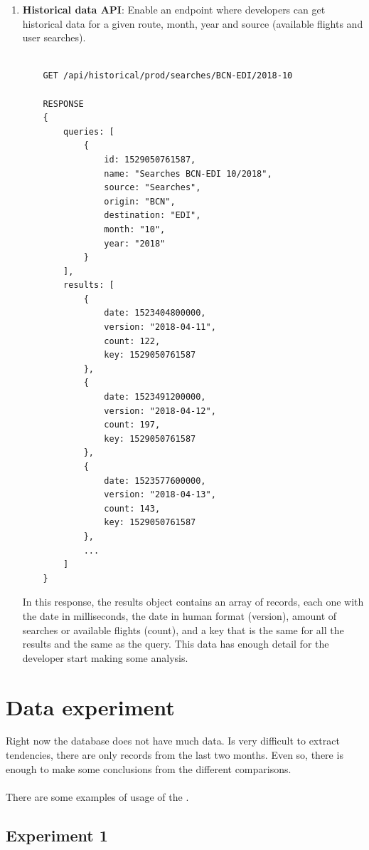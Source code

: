 \begin{enumerate}
    \item \textbf{Historical data API}: Enable an endpoint where developers can get historical data for a given route, month, year and source (available flights and user searches).
    \\\\
    \begin{verbatim}
    GET /api/historical/prod/searches/BCN-EDI/2018-10

    RESPONSE
    {
        queries: [
            {
                id: 1529050761587,
                name: "Searches BCN-EDI 10/2018",
                source: "Searches",
                origin: "BCN",
                destination: "EDI",
                month: "10",
                year: "2018"
            }
        ],
        results: [
            {
                date: 1523404800000,
                version: "2018-04-11",
                count: 122,
                key: 1529050761587
            },
            {
                date: 1523491200000,
                version: "2018-04-12",
                count: 197,
                key: 1529050761587
            },
            {
                date: 1523577600000,
                version: "2018-04-13",
                count: 143,
                key: 1529050761587
            },
            ...
        ]
    }
    \end{verbatim}
    In this response, the results object contains an array of records, each one with the date in milliseconds, the date in human format (version), amount of searches or available flights (count), and a key that is the same for all the results and the same as the query. This data has enough detail for the developer start making some analysis.

\end{enumerate}

\section{Data experiment}

Right now the database does not have much data. Is very difficult to extract tendencies, there are only records from the last two months. Even so, there is enough to make some conclusions from the different comparisons.
\\\\
There are some examples of usage of the \thesis.

\subsection*{Experiment 1} \label{exp1}

